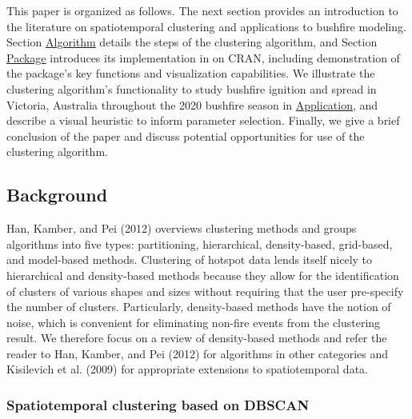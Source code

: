 This paper is organized as follows. The next section provides an introduction to the literature on spatiotemporal clustering and applications to bushfire modeling. Section \protect\hyperlink{algorithm}{Algorithm} details the steps of the clustering algorithm, and Section \protect\hyperlink{package}{Package} introduces its implementation in  on CRAN, including demonstration of the package's key functions and visualization capabilities. We illustrate the clustering algorithm's functionality to study bushfire ignition and spread in Victoria, Australia throughout the 2020 bushfire season in \protect\hyperlink{application}{Application}, and describe a visual heuristic to inform parameter selection. Finally, we give a brief conclusion of the paper and discuss potential opportunities for use of the clustering algorithm.

\hypertarget{background}{%
\subsection{Background}\label{background}}

Han, Kamber, and Pei (2012) overviews clustering methods and groups algorithms into five types: partitioning, hierarchical, density-based, grid-based, and model-based methods. Clustering of hotspot data lends itself nicely to hierarchical and density-based methods because they allow for the identification of clusters of various shapes and sizes without requiring that the user pre-specify the number of clusters. Particularly, density-based methods have the notion of noise, which is convenient for eliminating non-fire events from the clustering result. We therefore focus on a review of density-based methods and refer the reader to Han, Kamber, and Pei (2012) for algorithms in other categories and Kisilevich et al. (2009) for appropriate extensions to spatiotemporal data.

\hypertarget{spatiotemporal-clustering-based-on-dbscan}{%
\subsubsection{Spatiotemporal clustering based on DBSCAN}\label{spatiotemporal-clustering-based-on-dbscan}}

